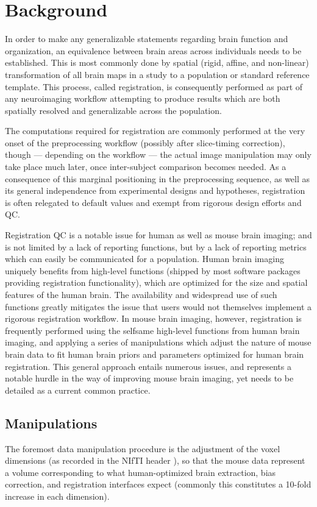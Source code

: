 \section{Background}
\label{sec:bg}

In order to make any generalizable statements regarding brain function and organization, an equivalence between brain areas across individuals needs to be established.
This is most commonly done by spatial (rigid, affine, and non-linear) transformation of all brain maps in a study to a population or standard reference template.
This process, called registration, is consequently performed as part of any neuroimaging workflow attempting to produce results which are both spatially resolved and generalizable across the population.

The computations required for registration are commonly performed at the very onset of the preprocessing workflow (possibly after slice-timing correction),
though --- depending on the workflow --- the actual image manipulation may only take place much later, once inter-subject comparison becomes needed.
As a consequence of this marginal positioning in the preprocessing sequence, as well as its general independence from experimental designs and hypotheses, registration is often relegated to default values and exempt from rigorous design efforts and QC.

Registration QC is a notable issue for human as well as mouse brain imaging;
and is not limited by a lack of reporting functions, but by a lack of reporting metrics which can easily be communicated for a population.
Human brain imaging uniquely benefits from high-level functions (shipped by most software packages providing registration functionality), which are optimized for the size and spatial features of the human brain.
The availability and widespread use of such functions greatly mitigates the issue that users would not themselves implement a rigorous registration workflow.
In mouse brain imaging, however, registration is frequently performed using the selfsame high-level functions from human brain imaging, and applying a series of manipulations which adjust the nature of mouse brain data to fit human brain priors and parameters optimized for human brain registration.
This general approach entails numerous issues, and represents a notable hurdle in the way of improving mouse brain imaging, yet needs to be detailed as a current common practice.

\subsection{Manipulations}
The foremost data manipulation procedure is the adjustment of the voxel dimensions (as recorded in the NIfTI header \cite{nifti}), so that the mouse data represent a volume corresponding to what human-optimized brain extraction, bias correction, and registration interfaces expect (commonly this constitutes a 10-fold increase in each dimension).

